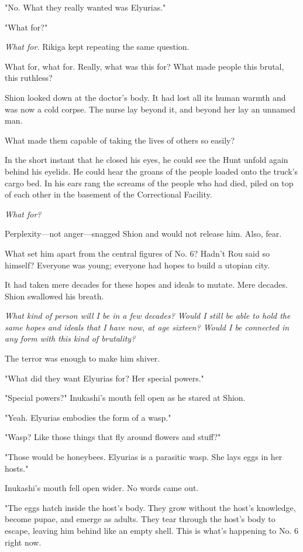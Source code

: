 "No. What they really wanted was Elyurias."

"What for?"

\emph{What for.} Rikiga kept repeating the same question.

What for, what for. Really, what was this for? What made people this
brutal, this ruthless?

Shion looked down at the doctor's body. It had lost all its human warmth
and was now a cold corpse. The nurse lay beyond it, and beyond her lay
an unnamed man.

What made them capable of taking the lives of others so easily?

In the short instant that he closed his eyes, he could see the Hunt
unfold again behind his eyelids. He could hear the groans of the people
loaded onto the truck's cargo bed. In his ears rang the screams of the
people who had died, piled on top of each other in the basement of the
Correctional Facility.

\emph{What for?}

Perplexity---not anger---snagged Shion and would not release him. Also,
fear.

What set him apart from the central figures of No. 6? Hadn't Rou said so
himself? Everyone was young; everyone had hopes to build a utopian city.

It had taken mere decades for these hopes and ideals to mutate. Mere
decades. Shion swallowed his breath.

\emph{What kind of person will I be in a few decades? Would I still be able to
hold the same hopes and ideals that I have now, at age sixteen? Would I
be connected in any form with this kind of brutality?}

The terror was enough to make him shiver.

"What did they want Elyurias for? Her special powers."

"Special powers?" Inukashi's mouth fell open as he stared at Shion.

"Yeah. Elyurias embodies the form of a wasp."

"Wasp? Like those things that fly around flowers and stuff?"

"Those would be honeybees. Elyurias is a parasitic wasp. She lays eggs
in her hosts."

Inukashi's mouth fell open wider. No words came out.

"The eggs hatch inside the host's body. They grow without the host's
knowledge, become pupae, and emerge as adults. They tear through the
host's body to escape, leaving him behind like an empty shell. This is
what's happening to No. 6 right now.


